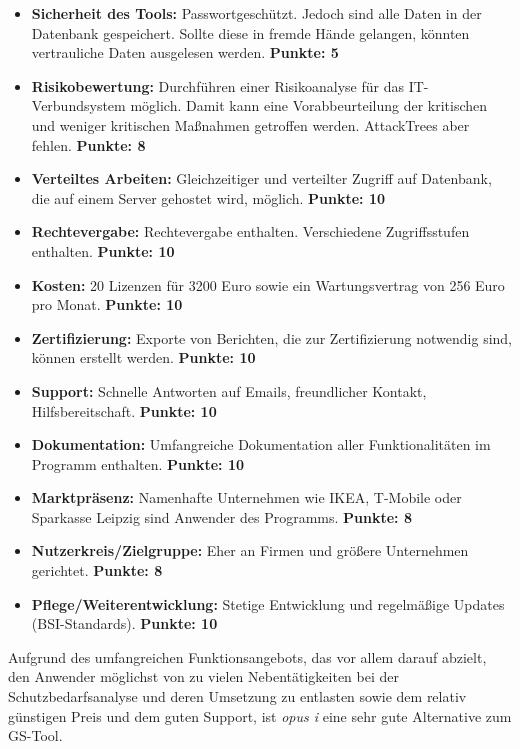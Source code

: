 \begin{itemize}
\item \textbf{Sicherheit des Tools:} Passwortgeschützt. Jedoch sind alle Daten in der Datenbank gespeichert. Sollte diese in fremde Hände gelangen, könnten vertrauliche Daten ausgelesen werden.  \textbf{Punkte: 5}
\item \textbf{Risikobewertung:} Durchführen einer Risikoanalyse für das IT-Verbundsystem möglich. Damit kann eine Vorabbeurteilung der kritischen und weniger kritischen Maßnahmen getroffen werden. AttackTrees aber fehlen. \textbf{Punkte: 8}
\item \textbf{Verteiltes Arbeiten:} Gleichzeitiger und verteilter Zugriff auf Datenbank, die auf einem Server gehostet wird, möglich. \textbf{Punkte: 10}
\item \textbf{Rechtevergabe:} Rechtevergabe enthalten. Verschiedene Zugriffsstufen enthalten. \textbf{Punkte: 10}
\item \textbf{Kosten:} 20 Lizenzen für 3200 Euro sowie ein Wartungsvertrag von 256 Euro pro Monat. \textbf{Punkte: 10}
\item \textbf{Zertifizierung:} Exporte von Berichten, die zur Zertifizierung notwendig sind, können erstellt werden. \textbf{Punkte: 10}
\item \textbf{Support:} Schnelle Antworten auf Emails, freundlicher Kontakt, Hilfsbereitschaft. \textbf{Punkte: 10}
\item \textbf{Dokumentation:} Umfangreiche Dokumentation aller Funktionalitäten im Programm enthalten. \textbf{Punkte: 10}
\item \textbf{Marktpräsenz:} Namenhafte Unternehmen wie IKEA, T-Mobile oder Sparkasse Leipzig sind Anwender des Programms. \textbf{Punkte: 8}
\item \textbf{Nutzerkreis/Zielgruppe:} Eher an Firmen und größere Unternehmen gerichtet. \textbf{Punkte: 8}
\item \textbf{Pflege/Weiterentwicklung:} Stetige Entwicklung und regelmäßige Updates (BSI-Standards). \textbf{Punkte: 10}

\end{itemize}

Aufgrund des umfangreichen Funktionsangebots, das vor allem darauf abzielt, den Anwender möglichst von zu vielen Nebentätigkeiten bei der Schutzbedarfsanalyse und deren Umsetzung zu entlasten sowie dem relativ günstigen Preis und dem guten Support, ist \textit{opus i} eine sehr gute Alternative zum GS-Tool.

